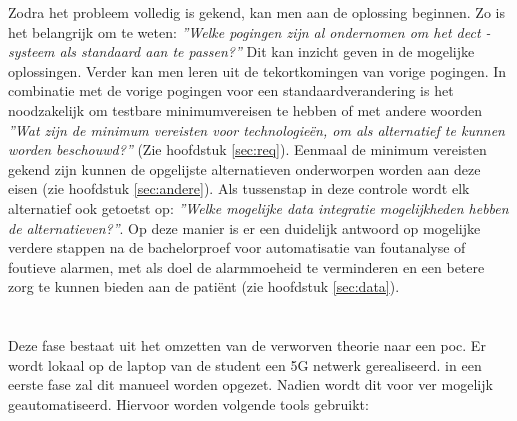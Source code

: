 Zodra het probleem volledig is gekend, kan men aan de oplossing beginnen. Zo is het belangrijk om te weten: \textit{''Welke pogingen zijn al ondernomen om het \gls{dect} -systeem als standaard aan te passen?''} Dit kan inzicht geven in de mogelijke oplossingen. Verder kan men leren uit de tekortkomingen van vorige pogingen. In combinatie met de vorige pogingen voor een standaardverandering is het noodzakelijk om testbare minimumvereisen te hebben of met andere woorden \textit{''Wat zijn de minimum vereisten voor technologieën, om als alternatief te kunnen worden beschouwd?''} (Zie hoofdstuk \ref{sec:req}). 
Eenmaal de minimum vereisten gekend zijn kunnen de opgelijste alternatieven onderworpen worden aan deze eisen (zie hoofdstuk \ref{sec:andere}). Als tussenstap in deze controle wordt elk alternatief ook getoetst op: \textit{''Welke mogelijke data integratie mogelijkheden hebben de alternatieven?''}. Op deze manier is er een duidelijk antwoord op mogelijke verdere stappen na de bachelorproef voor automatisatie van foutanalyse of foutieve alarmen, met als doel de alarmmoeheid te verminderen en een betere zorg te kunnen bieden aan de patiënt (zie hoofdstuk \ref{sec:data}).



\section{}%
\label{sec:poc1}%
Deze fase bestaat uit het omzetten van de verworven theorie naar een \gls{poc}. Er wordt lokaal op de laptop van de student een 5G netwerk gerealiseerd. in een eerste fase zal dit manueel worden opgezet. Nadien wordt dit voor ver mogelijk geautomatiseerd. Hiervoor worden volgende tools gebruikt:


